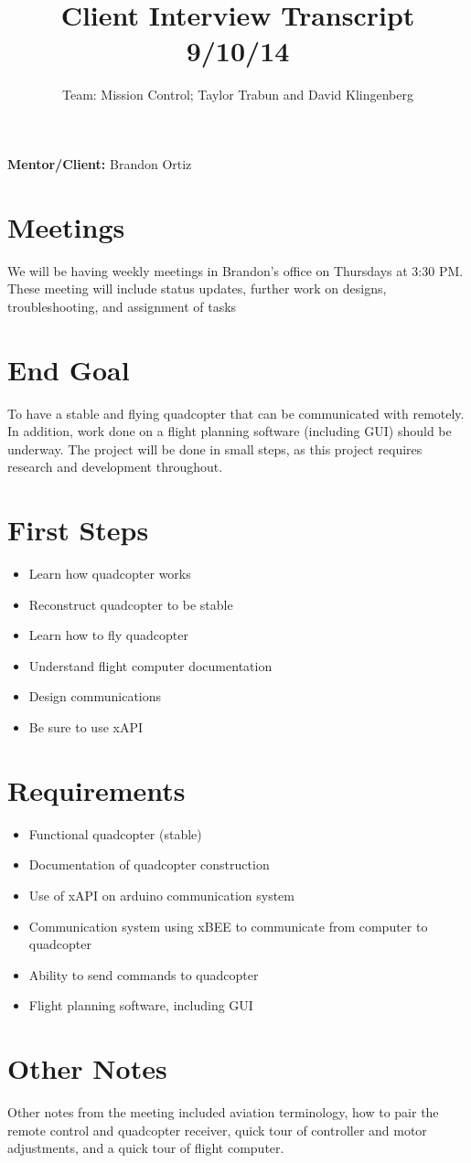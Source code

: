 \documentclass[11pt,a4paper]{article}
\title{Client Interview Transcript 9/10/14}
\author{Team: Mission Control; Taylor Trabun and David Klingenberg}
\begin{document}
\maketitle
\textbf{Mentor/Client: }Brandon Ortiz

\section{Meetings}
We will be having weekly meetings in Brandon's office on Thursdays at 3:30 PM. These meeting will include status updates, further work on designs, troubleshooting, and assignment of tasks

\section{End Goal}
To have a stable and flying quadcopter that can be communicated with remotely. In addition, work done on a flight planning software (including GUI) should be underway. The project will be done in small steps, as this project requires research and development throughout.

\section{First Steps}
	\begin{itemize}
		\item Learn how quadcopter works
		\item Reconstruct quadcopter to be stable 
		\item Learn how to fly quadcopter
		\item Understand flight computer documentation
		\item Design communications
		\item Be sure to use xAPI
	\end{itemize}
	
\section{Requirements}
	\begin{itemize}
		\item Functional quadcopter (stable)
		\item Documentation of quadcopter construction
		\item Use of xAPI on arduino communication system
		\item Communication system using xBEE to communicate from computer to quadcopter
		\item Ability to send commands to quadcopter
		\item Flight planning software, including GUI
	\end{itemize}
	
\section{Other Notes}
Other notes from the meeting included aviation terminology, how to pair the remote control and quadcopter receiver, quick tour of controller and motor adjustments, and a quick tour of flight computer.
\end{document}
